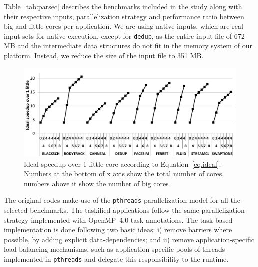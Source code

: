Table~\ref{tab:parsec} describes the benchmarks included in the study along with their respective 
inputs, parallelization strategy and performance ratio between big and 
little cores per application. We are using native inputs, which are real input 
sets for native execution, except for \texttt{dedup}, as the entire input file of 672 MB and the 
intermediate data structures do not fit in the memory system of our platform. Instead, 
we reduce the size of the input file to 351 MB.

\begin{figure}[t]%
	\centering
	\includegraphics[width=1\columnwidth]{figures/ideal_speedup.pdf}
	\vspace{-0.5cm}
	\caption{Ideal speedup over 1 little core according to Equation~\ref{eq.ideal}. Numbers at the bottom of x axis show the total number of cores, numbers above it show the number of big cores}
	\label{fig:ideal}%
	\vspace{-0.7cm}
\end{figure}

The original codes make use of the \texttt{pthreads} parallelization model for all the selected benchmarks. The taskified applications follow the same parallelization strategy implemented with OpenMP~4.0 task annotations.
The task-based implementation is done following two basic ideas: i) remove barriers where possible, by adding explicit data-dependencies; and ii) remove application-specific load balancing mechanisms, such as application-specific pools of threads implemented in \texttt{pthreads} and delegate this responsibility to the runtime.

